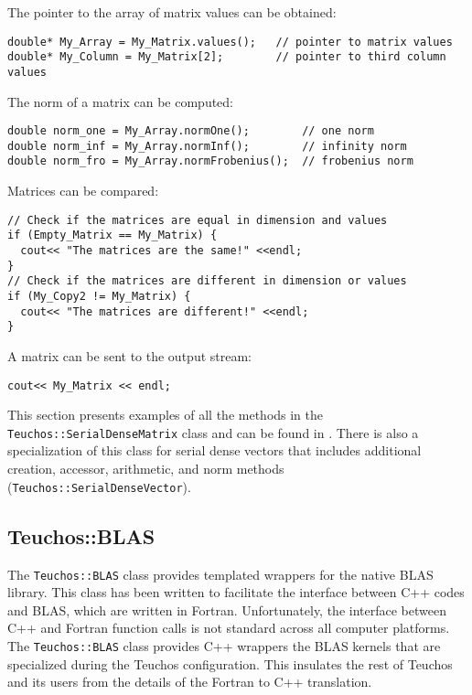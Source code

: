 The pointer to the array of matrix values can be obtained:
{\small
\begin{verbatim}
double* My_Array = My_Matrix.values();   // pointer to matrix values
double* My_Column = My_Matrix[2];        // pointer to third column values
\end{verbatim}}
The norm of a matrix can be computed:
{\small
\begin{verbatim}
double norm_one = My_Array.normOne();        // one norm
double norm_inf = My_Array.normInf();        // infinity norm
double norm_fro = My_Array.normFrobenius();  // frobenius norm
\end{verbatim}}
Matrices can be compared:
{\small
\begin{verbatim}
// Check if the matrices are equal in dimension and values
if (Empty_Matrix == My_Matrix) {
  cout<< "The matrices are the same!" <<endl;
}
// Check if the matrices are different in dimension or values
if (My_Copy2 != My_Matrix) {
  cout<< "The matrices are different!" <<endl;
}
\end{verbatim}}
A matrix can be sent to the output stream:
{\small
\begin{verbatim}
cout<< My_Matrix << endl;
\end{verbatim}}
This section presents examples of all the methods in the 
{\tt Teuchos::SerialDenseMatrix} class and can be found in
.  There is also a specialization of
this class for serial dense vectors that includes additional creation, accessor, 
arithmetic, and norm methods ({\tt Teuchos::SerialDenseVector}).


\subsection{Teuchos::BLAS}
\label{sec:teuchos:BLAS}

The \verb!Teuchos::BLAS! class provides templated wrappers for the native BLAS library.
This class has been written to facilitate the interface between C++ codes and BLAS,
which are written in Fortran.  Unfortunately, the interface between C++ and Fortran
function calls is not standard across all computer platforms.  The \verb!Teuchos::BLAS!
class provides C++ wrappers the BLAS kernels that are specialized during the Teuchos
configuration.  This insulates the rest of Teuchos and its users from the details of
the Fortran to C++ translation.

